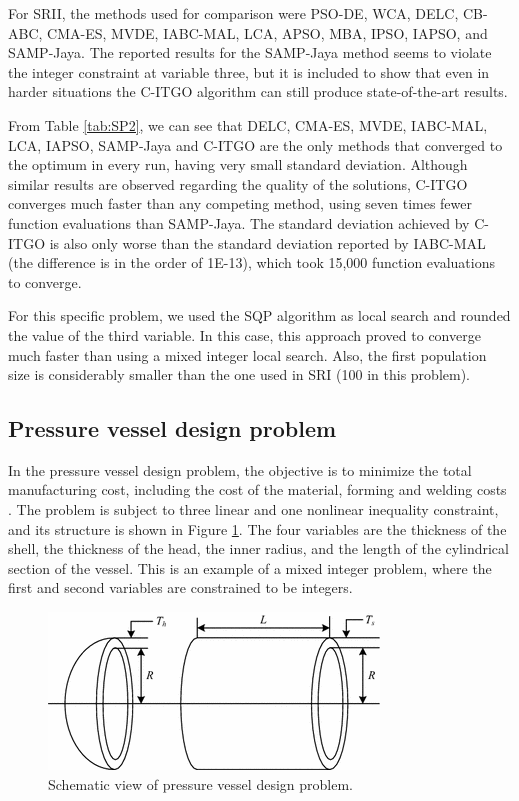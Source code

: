 For SRII, the methods used for comparison were PSO-DE, WCA, DELC, CB-ABC, CMA-ES, MVDE, IABC-MAL, LCA, APSO, MBA, IPSO, IAPSO, and SAMP-Jaya. The reported results for the SAMP-Jaya method seems to violate the integer constraint at variable three, but it is included to show that even in harder situations the C-ITGO algorithm can still produce state-of-the-art results.

From Table \ref{tab:SP2}, we can see that DELC, CMA-ES, MVDE, IABC-MAL, LCA, IAPSO, SAMP-Jaya and C-ITGO are the only methods that converged to the optimum in every run, having very small standard deviation. Although similar results are observed regarding the quality of the solutions, C-ITGO converges much faster than any competing method, using seven times fewer function evaluations than SAMP-Jaya. The standard deviation achieved by C-ITGO is also only worse than the standard deviation reported by IABC-MAL (the difference is in the order of 1E-13), which took 15,000 function evaluations to converge.



For this specific problem, we used the SQP algorithm as local search and rounded the value of the third variable. In this case, this approach proved to converge much faster than using a mixed integer local search. Also, the first population size is considerably smaller than the one used in SRI (100 in this problem).



\subsection{Pressure vessel design problem}

In the pressure vessel design problem, the objective is to minimize the total manufacturing cost, including the cost of the material, forming and welding costs \citep{PV}. The problem is subject to three linear and one nonlinear inequality constraint, and its structure is shown in Figure \ref{fig:PV}. The four variables are the thickness of the shell, the thickness of the head, the inner radius, and the length of the cylindrical section of the vessel. This is an example of a mixed integer problem, where the first and second variables are constrained to be integers.


\begin{figure}[h]
\begin{center}
\includegraphics[scale=0.6]{Imgs/PV.png}
\end{center}
\captionsetup{justification=centering}
\caption{Schematic view of pressure vessel design problem.}\label{fig:PV}
\end{figure}



